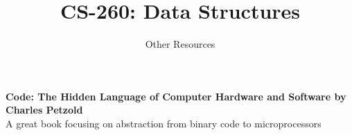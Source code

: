 \documentclass[10pt,letterpaper,oneside]{article}
\title{CS-260: Data Structures}
\author{Other Resources}
\date{}
\begin{document}
\maketitle

\textbf{Code: The Hidden Language of Computer Hardware and Software by Charles Petzold} \\
A great book focusing on abstraction from binary code to microprocessors
\vspace{5mm}
\end{document}

